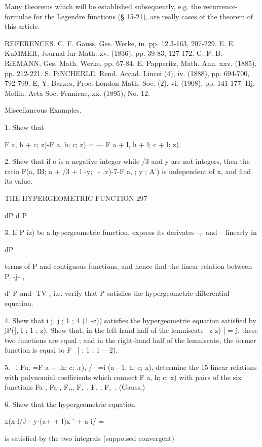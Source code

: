 Many theorems which will be established subsequently, e.g. the recurrence-formulae 
for the Legendre functions (§ 15-21), are really cases of the theorem of this article. 

REFERENCES. 
C. F. Gauss, Ges. Werke, in. pp. 12.3-163, 207-229. 
E. E. KuMMER, Journal fur Math. xv. (1836), pp. 39-83, 127-172. 
G. F. B. RiEMANN, Ges. Math. Werke, pp. 67-84. 
E. Papperitz, Math. Ann. xxv. (1885), pp. 212-221. 
S. PiNCHERLE, Rend. Accad. Lincei (4), iv. (1888), pp. 694-700, 792-799. 
E.  Y. Barxes, Proc. London Math. Soc. (2), vi. (1908), pp. 141-177. 
Hj. Mellin, Acta Soc. Fennicae, xx. (1895), No. 12. 

Miscellaneous Examples. 

1. Shew that 

F a, h + \; c; z)-F a, b; c; z) = — F a + l, h + l; c + l; z). 

2. Shew that if o is a negative integer while /3 and y are not integers, then the ratio 
F(a, IB; a + /3 + l -y; \ - .v)-7-F a,   ; y ; A') is independent of x, and find its value. 



THE HYPERGEOMETRIC FUNCTION 297 

dP d P 

3. If P iz) be a hypergeometrie function, express its derivates -,- and --  linearly in 

dP 

terms of P and contiguous functions, and hence find the linear relation between P, -j- , 

d'-P 
and -TV , i.e. verify that P satisfies the hypergeometrie difterential equation. 

4. Shew that i  j, j ; 1 ; 4 (1 -z)) satisfies the hypergeometrie equation satisfied by 
jP(|, I ; 1 ; z). Shew that, in the left-hand half of the lemniscate \ z  z) | = j, these two 
functions are equal ; and in the right-hand half of the lemniscate, the former function is 
equal to F \, | ; 1 ; 1 —2). 

5. \ i Fu, =F  a +  ,h; c; .r), /  \  =i (a - 1, h; c; x), determine the 15 linear relations 
with polynomial coefficients which connect F a, h; c; x) with pairs of the six functions 
Fa , Fa-, F,,, F,\ , F, , F,\ . (Gauss.) 

6. Shew that the hypergeometrie equation 

x(x-l/J - y-(a+  + l)x '  + a i/ = 

is satisfied by the two integrals (suppo.sed convergent) 

